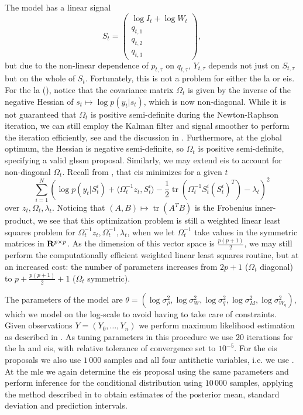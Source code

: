 The model has a linear signal 
$$
    S_{t} = \begin{pmatrix}
        \log I_{t} + \log W_{t} \\
        q_{t, 1} \\
        q_{t, 2} \\
        q_{t, 3} 
    \end{pmatrix},
$$
but due to the non-linear dependence of $p_{t,\tau}$ on $q_{t,\tau}$,  $Y_{t,\tau}$ depends not just on $S_{t, \tau}$ but on the whole of $S_{t}$. Fortunately, this is not a problem for either the \acrshort{la} or \acrshort{eis}. For the \acrshort{la} (), notice that the covariance matrix $\Omega_{t}$ is given by the inverse of the negative Hessian of $s_{t} \mapsto \log p(y_{t}|s_{t})$, which is now non-diagonal. While it is not guaranteed that $\Omega_{t}$ is positive semi-definite during the Newton-Raphson iteration, we can still employ the Kalman filter and signal smoother to perform the iteration efficiently, see \citep{Jungbacker2007Monte} and the discussion in . Furthermore, at the global optimum, the Hessian is negative semi-definite, so $\Omega_{t}$ is positive semi-definite, specifying a valid \acrshort{glssm} proposal. 
Similarly, we may extend \acrshort{eis} to account for non-diagonal $\Omega_{t}$. Recall from , that \acrshort{eis} minimizes for a given $t$ 
$$
    \sum_{i = 1}^N \left( \log p(y_{t} | S^{i}_t) + \langle \Omega_{t}^{-1}z_{t}, S^{i}_{t}\rangle - \frac{1}{2} \operatorname{tr} \left(\Omega^{-1}_{t}S^{i}_{t}(S^{i}_t)^{T}\right)- \lambda_{t} \right)^{2}
$$
over $z_{t}, \Omega_{t}, \lambda_{t}$. Noticing that $(A,B) \mapsto \operatorname{tr} \left( A^{T}B \right)$ is the Frobenius inner-product, we see that this optimization problem is still a weighted linear least squares problem for $\Omega_{t}^{-1}z_{t}, \Omega^{-1}_t, \lambda_{t}$, when we let $\Omega_{t}^{-1}$ take values in the symmetric matrices in $\mathbf R^{p \times p}$. As the dimension of this vector space is $ \frac{p (p + 1)}{2}$, we may still perform the computationally efficient weighted linear least squares routine, but at an increased cost: the number of parameters increases from $2p + 1$ ($\Omega_{t}$ diagonal) to $p + \frac{p(p + 1)}{2} + 1$ ($\Omega_{t}$ symmetric). 

The parameters of the model are $\theta = \left( \log \sigma^{2}_{\rho}, \log \sigma^{2}_{W}, \log \sigma^{2}_{q}, \log \sigma^{2}_M, \log \sigma^{2}_{W_{q}}\right)$, which we model on the log-scale to avoid having to take care of constraints. Given observations $Y = (Y_{0}, \dots, Y_{n})$ we perform maximum likelihood estimation as described in . As tuning parameters in this procedure we use $20$ iterations for the \acrshort{la} and \acrshort{eis}, with relative tolerance of convergence set to $10^{-5}$. For the \acrshort{eis} proposals we also use $1\,000$ samples and all four antithetic variables, i.e. we use . At the \acrshort{mle} we again determine the \acrshort{eis} proposal using the same parameters and perform inference for the conditional distribution using $10\,000$ samples, applying the method described in  to obtain estimates of the posterior mean, standard deviation and prediction intervals. 


